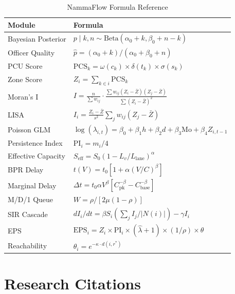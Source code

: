 \documentclass[12pt,a4paper]{article}
\begin{document}
\begin{table}[H]
\centering
\caption{NammaFlow Formula Reference}
\begin{tabular}{p{3cm}p{8.5cm}}
\toprule
\textbf{Module} & \textbf{Formula} \\
\midrule
Bayesian Posterior & $p \mid k, n \sim \text{Beta}(\alpha_0 + k, \beta_0 + n - k)$ \\
Officer Quality & $\hat{p} = (\alpha_0 + k) / (\alpha_0 + \beta_0 + n)$ \\
PCU Score & $\text{PCS}_k = \omega(c_k) \times \delta(t_k) \times \sigma(s_k)$ \\
Zone Score & $Z_i = \sum_{k \in i} \text{PCS}_k$ \\
Moran's I & $I = \frac{n}{\sum w_{ij}} \cdot \frac{\sum w_{ij}(Z_i-\bar Z)(Z_j-\bar Z)}{\sum(Z_i-\bar Z)^2}$ \\
LISA & $I_i = \frac{Z_i - \bar Z}{s^2} \sum_j w_{ij}(Z_j - \bar Z)$ \\
Poisson GLM & $\log(\lambda_{i,t}) = \beta_0 + \beta_1 h + \beta_2 d + \beta_3 \text{Mo} + \beta_4 Z_{i,t-1}$ \\
Persistence Index & $\text{PI}_i = m_i / 4$ \\
Effective Capacity & $S_\text{eff} = S_0 (1 - L_v/L_\text{lane})^\alpha$ \\
BPR Delay & $t(V) = t_0 [1 + \alpha (V/C)^\beta]$ \\
Marginal Delay & $\Delta t = t_0 \alpha V^\beta [C_\text{pk}^{-\beta} - C_\text{base}^{-\beta}]$ \\
M/D/1 Queue & $W = \rho / [2\mu(1-\rho)]$ \\
SIR Cascade & $dI_i/dt = \beta S_i (\sum_j I_j / |N(i)|) - \gamma I_i$ \\
EPS & $\text{EPS}_i = Z_i \times \text{PI}_i \times (\hat\lambda + 1) \times (1/\rho) \times \theta$ \\
Reachability & $\theta_i = e^{-\kappa \cdot d(i, r^*)}$ \\
\bottomrule
\end{tabular}
\end{table}

\section{Research Citations}
\end{document}
